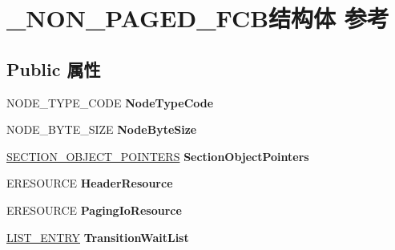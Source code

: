 \hypertarget{struct___n_o_n___p_a_g_e_d___f_c_b}{}\section{\+\_\+\+N\+O\+N\+\_\+\+P\+A\+G\+E\+D\+\_\+\+F\+C\+B结构体 参考}
\label{struct___n_o_n___p_a_g_e_d___f_c_b}
\subsection*{Public 属性}
\begin{DoxyCompactItemize}
\item 
\mbox{\label{struct___n_o_n___p_a_g_e_d___f_c_b_a71cac2a0d7c527c7465cc9eb3194a83c}} 
N\+O\+D\+E\+\_\+\+T\+Y\+P\+E\+\_\+\+C\+O\+DE {\bfseries Node\+Type\+Code}
\item 
\mbox{\label{struct___n_o_n___p_a_g_e_d___f_c_b_a68a57e8931aa29b2cfcec3dd8d9c7fe6}} 
N\+O\+D\+E\+\_\+\+B\+Y\+T\+E\+\_\+\+S\+I\+ZE {\bfseries Node\+Byte\+Size}
\item 
\mbox{\label{struct___n_o_n___p_a_g_e_d___f_c_b_ac23e7da461bd658a2b54b756afd2112f}} 
\hyperlink{struct___s_e_c_t_i_o_n___o_b_j_e_c_t___p_o_i_n_t_e_r_s}{S\+E\+C\+T\+I\+O\+N\+\_\+\+O\+B\+J\+E\+C\+T\+\_\+\+P\+O\+I\+N\+T\+E\+RS} {\bfseries Section\+Object\+Pointers}
\item 
\mbox{\label{struct___n_o_n___p_a_g_e_d___f_c_b_a647dcf81143d4ada25456348be2a59eb}} 
E\+R\+E\+S\+O\+U\+R\+CE {\bfseries Header\+Resource}
\item 
\mbox{\label{struct___n_o_n___p_a_g_e_d___f_c_b_a69779ec548ca5bb627da4c70595d972f}} 
E\+R\+E\+S\+O\+U\+R\+CE {\bfseries Paging\+Io\+Resource}
\item 
\mbox{\label{struct___n_o_n___p_a_g_e_d___f_c_b_a9a15b51f1d3b0d2314c60583754f9684}} 
\hyperlink{struct___l_i_s_t___e_n_t_r_y}{L\+I\+S\+T\+\_\+\+E\+N\+T\+RY} {\bfseries Transition\+Wait\+List}
\item 
\mbox{\label{struct___n_o_n___p_a_g_e_d___f_c_b_a4972d7b87db5815c21b1a9ce3e94fe23}} 

\end{DoxyCompactItemize}
